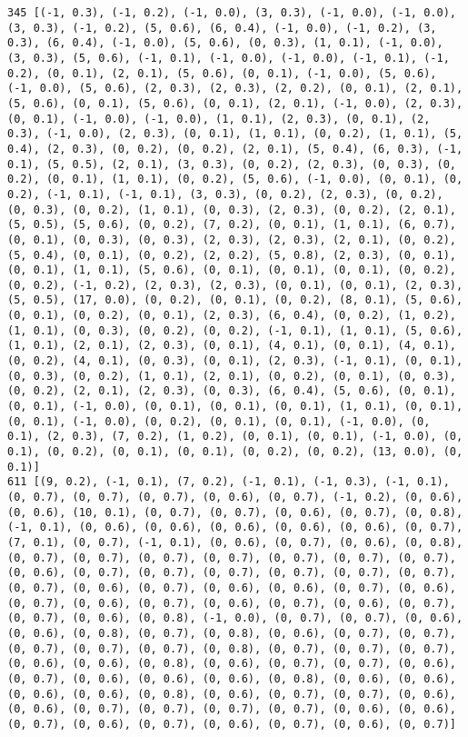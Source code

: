 \documentclass[11pt]{article}
\begin{document}
\begin{Verbatim}[commandchars=\\\{\}]
345 [(-1, 0.3), (-1, 0.2), (-1, 0.0), (3, 0.3), (-1, 0.0), (-1, 0.0), (3, 0.3), (-1, 0.2), (5, 0.6), (6, 0.4), (-1, 0.0), (-1, 0.2), (3, 0.3), (6, 0.4), (-1, 0.0), (5, 0.6), (0, 0.3), (1, 0.1), (-1, 0.0), (3, 0.3), (5, 0.6), (-1, 0.1), (-1, 0.0), (-1, 0.0), (-1, 0.1), (-1, 0.2), (0, 0.1), (2, 0.1), (5, 0.6), (0, 0.1), (-1, 0.0), (5, 0.6), (-1, 0.0), (5, 0.6), (2, 0.3), (2, 0.3), (2, 0.2), (0, 0.1), (2, 0.1), (5, 0.6), (0, 0.1), (5, 0.6), (0, 0.1), (2, 0.1), (-1, 0.0), (2, 0.3), (0, 0.1), (-1, 0.0), (-1, 0.0), (1, 0.1), (2, 0.3), (0, 0.1), (2, 0.3), (-1, 0.0), (2, 0.3), (0, 0.1), (1, 0.1), (0, 0.2), (1, 0.1), (5, 0.4), (2, 0.3), (0, 0.2), (0, 0.2), (2, 0.1), (5, 0.4), (6, 0.3), (-1, 0.1), (5, 0.5), (2, 0.1), (3, 0.3), (0, 0.2), (2, 0.3), (0, 0.3), (0, 0.2), (0, 0.1), (1, 0.1), (0, 0.2), (5, 0.6), (-1, 0.0), (0, 0.1), (0, 0.2), (-1, 0.1), (-1, 0.1), (3, 0.3), (0, 0.2), (2, 0.3), (0, 0.2), (0, 0.3), (0, 0.2), (1, 0.1), (0, 0.3), (2, 0.3), (0, 0.2), (2, 0.1), (5, 0.5), (5, 0.6), (0, 0.2), (7, 0.2), (0, 0.1), (1, 0.1), (6, 0.7), (0, 0.1), (0, 0.3), (0, 0.3), (2, 0.3), (2, 0.3), (2, 0.1), (0, 0.2), (5, 0.4), (0, 0.1), (0, 0.2), (2, 0.2), (5, 0.8), (2, 0.3), (0, 0.1), (0, 0.1), (1, 0.1), (5, 0.6), (0, 0.1), (0, 0.1), (0, 0.1), (0, 0.2), (0, 0.2), (-1, 0.2), (2, 0.3), (2, 0.3), (0, 0.1), (0, 0.1), (2, 0.3), (5, 0.5), (17, 0.0), (0, 0.2), (0, 0.1), (0, 0.2), (8, 0.1), (5, 0.6), (0, 0.1), (0, 0.2), (0, 0.1), (2, 0.3), (6, 0.4), (0, 0.2), (1, 0.2), (1, 0.1), (0, 0.3), (0, 0.2), (0, 0.2), (-1, 0.1), (1, 0.1), (5, 0.6), (1, 0.1), (2, 0.1), (2, 0.3), (0, 0.1), (4, 0.1), (0, 0.1), (4, 0.1), (0, 0.2), (4, 0.1), (0, 0.3), (0, 0.1), (2, 0.3), (-1, 0.1), (0, 0.1), (0, 0.3), (0, 0.2), (1, 0.1), (2, 0.1), (0, 0.2), (0, 0.1), (0, 0.3), (0, 0.2), (2, 0.1), (2, 0.3), (0, 0.3), (6, 0.4), (5, 0.6), (0, 0.1), (0, 0.1), (-1, 0.0), (0, 0.1), (0, 0.1), (0, 0.1), (1, 0.1), (0, 0.1), (0, 0.1), (-1, 0.0), (0, 0.2), (0, 0.1), (0, 0.1), (-1, 0.0), (0, 0.1), (2, 0.3), (7, 0.2), (1, 0.2), (0, 0.1), (0, 0.1), (-1, 0.0), (0, 0.1), (0, 0.2), (0, 0.1), (0, 0.1), (0, 0.2), (0, 0.2), (13, 0.0), (0, 0.1)]
611 [(9, 0.2), (-1, 0.1), (7, 0.2), (-1, 0.1), (-1, 0.3), (-1, 0.1), (0, 0.7), (0, 0.7), (0, 0.7), (0, 0.6), (0, 0.7), (-1, 0.2), (0, 0.6), (0, 0.6), (10, 0.1), (0, 0.7), (0, 0.7), (0, 0.6), (0, 0.7), (0, 0.8), (-1, 0.1), (0, 0.6), (0, 0.6), (0, 0.6), (0, 0.6), (0, 0.6), (0, 0.7), (7, 0.1), (0, 0.7), (-1, 0.1), (0, 0.6), (0, 0.7), (0, 0.6), (0, 0.8), (0, 0.7), (0, 0.7), (0, 0.7), (0, 0.7), (0, 0.7), (0, 0.7), (0, 0.7), (0, 0.6), (0, 0.7), (0, 0.7), (0, 0.7), (0, 0.7), (0, 0.7), (0, 0.7), (0, 0.7), (0, 0.6), (0, 0.7), (0, 0.6), (0, 0.6), (0, 0.7), (0, 0.6), (0, 0.7), (0, 0.6), (0, 0.7), (0, 0.6), (0, 0.7), (0, 0.6), (0, 0.7), (0, 0.7), (0, 0.6), (0, 0.8), (-1, 0.0), (0, 0.7), (0, 0.7), (0, 0.6), (0, 0.6), (0, 0.8), (0, 0.7), (0, 0.8), (0, 0.6), (0, 0.7), (0, 0.7), (0, 0.7), (0, 0.7), (0, 0.7), (0, 0.8), (0, 0.7), (0, 0.7), (0, 0.7), (0, 0.6), (0, 0.6), (0, 0.8), (0, 0.6), (0, 0.7), (0, 0.7), (0, 0.6), (0, 0.7), (0, 0.6), (0, 0.6), (0, 0.6), (0, 0.8), (0, 0.6), (0, 0.6), (0, 0.6), (0, 0.6), (0, 0.8), (0, 0.6), (0, 0.7), (0, 0.7), (0, 0.6), (0, 0.6), (0, 0.7), (0, 0.7), (0, 0.7), (0, 0.7), (0, 0.6), (0, 0.6), (0, 0.7), (0, 0.6), (0, 0.7), (0, 0.6), (0, 0.7), (0, 0.6), (0, 0.7)]

\end{Verbatim}
\end{document}
